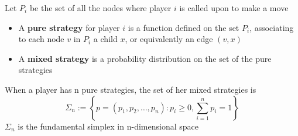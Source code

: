 \documentclass[../main.tex]{subfiles}
\begin{document}
\begin{definition}
    Let $P_i$ be the set of all the nodes where player $i$ is called upon to make a move
    \begin{itemize}
        \item A \textbf{pure strategy} for player $i$ is a function defined on the set $P_i$, associating to each node $v$ in $P_i$ a child $x$, or equivalently an edge $(v,x)$
        \item A \textbf{mixed strategy} is a probability distribution on the set of the pure strategies
    \end{itemize}
\end{definition}

When a player has n pure strategies, the set of her mixed strategies is
\[
    \Sigma_n := \left\{ p = ( p_1, p_2, \ldots, p_n) : p_i \geq 0, \sum_{i=1}^n p_i = 1 \right\}
\]
$\Sigma_n$ is the fundamental simplex in n-dimensional space
\end{document}
